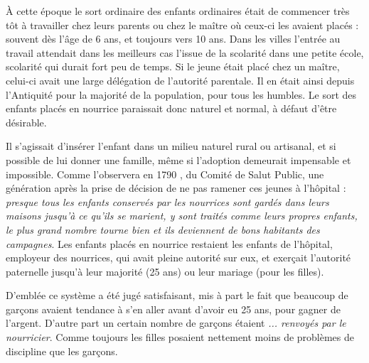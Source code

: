  À cette époque le sort ordinaire des enfants ordinaires était de commencer très tôt à travailler chez leurs parents ou chez le maître où ceux-ci les avaient placés : souvent dès l'âge de 6 ans, et toujours vers 10 ans. Dans les villes l'entrée au travail attendait dans les meilleurs cas l'issue de la scolarité dans une petite école, scolarité qui durait fort peu de temps. Si le jeune était placé chez un maître, celui-ci avait une large délégation de l'autorité parentale. Il en était ainsi depuis l'Antiquité pour la majorité de la population, pour tous les humbles. Le sort des enfants placés en nourrice paraissait donc naturel et normal, à défaut d'être désirable.

 Il s'agissait d'insérer l'enfant dans un milieu naturel rural ou artisanal, et si possible de lui donner une famille, même si l'adoption demeurait impensable et impossible. Comme l'observera en 1790 , du Comité de Salut Public, une génération après la prise de décision de ne pas ramener ces jeunes à l'hôpital : \emph{presque tous les enfants conservés par les nourrices sont gardés dans leurs maisons jusqu'à ce qu'ils se marient, y sont traités comme leurs propres enfants, le plus grand nombre tourne bien et ils deviennent de bons habitants des campagnes}. Les enfants placés en nourrice restaient les enfants de l'hôpital, employeur des nourrices, qui avait pleine autorité sur eux, et exerçait l'autorité paternelle jusqu'à leur majorité (25 ans) ou leur mariage (pour les filles). 

 D'emblée ce système a été jugé satisfaisant, mis à part le fait que beaucoup de garçons avaient tendance à s'en aller avant d'avoir eu 25 ans, pour gagner de l'argent. D'autre part un certain nombre de garçons étaient \emph{... renvoyés par le nourricier}. Comme toujours les filles posaient nettement moins de problèmes de discipline que les garçons. 

